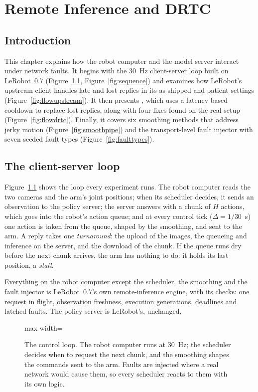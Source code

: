 \chapter{Remote Inference and DRTC}\label{ch:control}

\section{Introduction}
This chapter explains how the robot computer and the model server interact under network faults. It begins with the 30~Hz client-server loop built on LeRobot~0.7 (Figure~\ref{fig:architecture}, Figure~\ref{fig:sequence}) and examines how LeRobot's upstream client handles late and lost replies in its as-shipped and patient settings (Figure~\ref{fig:flowupstream}). It then presents \drtc{}, which uses a latency-based cooldown to replace lost replies, along with four fixes found on the real setup (Figure~\ref{fig:flowdrtc}). Finally, it covers six smoothing methods that address jerky motion (Figure~\ref{fig:smoothpipe}) and the transport-level fault injector with seven seeded fault types (Figure~\ref{fig:faulttypes}).

\section{The client-server loop}\label{sec:loop}

Figure~\ref{fig:architecture} shows the loop every experiment runs. The robot computer reads the two cameras and the
arm's joint positions; when its scheduler decides, it sends an observation to the policy server; the server answers
with a chunk of $H$ actions, which goes into the robot's action queue; and at every control tick ($\Delta = 1/30$~s)
one action is taken from the queue, shaped by the smoothing, and sent to the arm. A reply takes one \emph{turnaround}:
the upload of the images, the queueing and inference on the server, and the download of the chunk. If the queue runs
dry before the next chunk arrives, the arm has nothing to do: it holds its last position, a \emph{stall}.

Everything on the robot computer except the scheduler, the smoothing and the fault injector is LeRobot~0.7's own
remote-inference engine, with its checks: one request in flight, observation freshness, execution generations,
deadlines and latched faults. The policy server is LeRobot's, unchanged.

\begin{figure}[htbp]
  \centering
  \begin{adjustbox}{max width=\textwidth}\end{adjustbox}
  \caption{The control loop. The robot computer runs at 30~Hz; the scheduler decides when to request the next chunk,
           and the smoothing shapes the commands sent to the arm. Faults are injected where a real network would cause
           them, so every scheduler reacts to them with its own logic.}
  \label{fig:architecture}
\end{figure}

